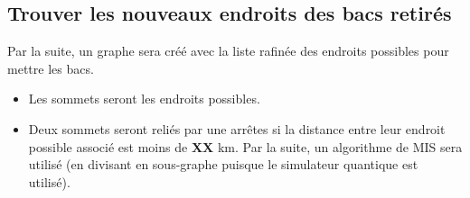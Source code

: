 \documentclass[11pt]{article}
\begin{document}
\subsection{Trouver les nouveaux endroits des bacs retirés}
Par la suite, un graphe sera créé avec la liste rafinée des endroits possibles pour mettre les bacs.
\begin{itemize}
    \item Les sommets seront les endroits possibles.
    \item Deux sommets seront reliés par une arrêtes si la distance entre leur endroit possible associé est moins de \textbf{XX} km. Par la suite, un algorithme de MIS sera utilisé (en divisant en sous-graphe puisque le simulateur quantique est utilisé). 

\end{itemize}
\textbf{}
\end{document}
